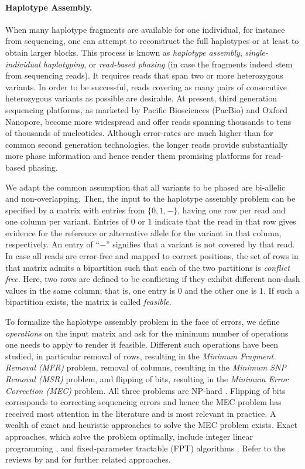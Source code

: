 \paragraph{Haplotype Assembly.}
When many haplotype fragments are available for one individual, for instance from sequencing, one can attempt to reconstruct the full haplotypes or at least to obtain larger blocks.
This process is known as \emph{haplotype assembly}, \emph{single-individual haplotyping}, or \emph{read-based phasing} (in case the fragments indeed stem from sequencing reads).
It requires reads that span two or more heterozygous variants.
In order to be successful, reads covering as many pairs of consecutive heterozygous variants as possible are desirable.
At present, third generation sequencing platforms, as marketed by Pacific Biosciences (PacBio) and Oxford Nanopore, become more widespread and offer reads spanning thousands to tens of thousands of nucleotides.
Although error-rates are much higher than for common second generation technologies, the longer reads provide substantially more phase information and hence render them promising platforms for read-based phasing.

We adapt the common assumption that all variants to be phased are bi-allelic and non-overlapping.
Then, the input to the haplotype assembly problem can be specified by a matrix with entries from $\{0,1,-\}$, having one row per read and one column per variant.
Entries of $0$ or $1$ indicate that the read in that row gives evidence for the reference or alternative allele for the variant in that column, respectively.
An entry of ``$-$'' signifies that a variant is not covered by that read.
In case all reads are error-free and mapped to correct positions, the set of rows in that matrix admits a bipartition such that each of the two partitions is \emph{conflict free}.
Here, two rows are defined to be conflicting if they exhibit different non-dash values in the same column; that is, one entry is $0$ and the other one is $1$.
If such a bipartition exists, the matrix is called \emph{feasible}.

To formalize the haplotype assembly problem in the face of errors, we define \emph{operations} on the input matrix and ask for the minimum number of operations one needs to apply to render it feasible.
Different such operations have been studied, in particular removal of rows, resulting in the \emph{Minimum Fragment Removal (MFR)} problem, removal of columns, resulting in the \emph{Minimum SNP Removal (MSR)} problem, and flipping of bits, resulting in the \emph{Minimum Error Correction (MEC)} problem.
All three problems are NP-hard \citep{Lancia2001,Cilibrasi2007}.
Flipping of bits corresponds to correcting sequencing errors and hence the MEC problem has received most attention in the literature and is most relevant in practice.
A wealth of exact and heuristic approaches to solve the MEC problem exists.
Exact approaches, which solve the problem optimally, include integer linear programming \citep{Fouilhoux2012,Chen2013}, and fixed-parameter tractable (FPT) algorithms \citep{He2010,Patterson2015,Pirola2015}.
Refer to the reviews by \cite{Schwartz2010} and \cite{Rhee2015} for further related approaches.


